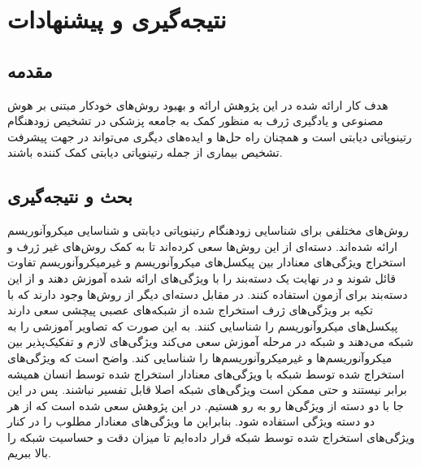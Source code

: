 \chapter{نتیجه‌گیری و پیشنهادات}

\section{مقدمه}
هدف کار ارائه شده در این پژوهش ارائه و بهبود روش‌های خودکار مبتنی بر هوش مصنوعی و یادگیری ژرف به منظور کمک به جامعه پزشکی در تشخیص زودهنگام رتینوپاتی دیابتی است و همچنان راه حل‌ها و ایده‌های دیگری می‌تواند در جهت پیشرفت تشخیص بیماری از جمله رتینوپاتی دیابتی کمک کننده باشند.
\section{بحث و نتیجه‌گیری}
روش‌های مختلفی برای شناسایی زودهنگام رتینوپاتی دیابتی و شناسایی میکروآنوریسم ارائه شده‌اند. دسته‌ای از این روش‌ها سعی کرده‌اند تا به کمک روش‌های غیر ژرف و استخراج ویژگی‌های معنادار بین پیکسل‌های میکروآنوریسم‌ و غیرمیکروآنوریسم‌ تفاوت قائل شوند و در نهایت یک دسته‌بند را با ویژگی‌های ارائه شده آموزش دهند و از این دسته‌بند برای آزمون استفاده کنند.
\noindent
در مقابل دسته‌ای دیگر از روش‌ها وجود دارند که با تکیه بر ویژگی‌های ژرف استخراج شده از شبکه‌های عصبی پیچشی سعی دارند پیکسل‌های میکروآنوریسم را شناسایی کنند. به این صورت که تصاویر آموزشی را به شبکه می‌دهند و شبکه در مرحله آموزش سعی می‌کند ویژگی‌های لازم و تفکیک‌پذیر بین میکروآنوریسم‌ها و غیرمیکروآنوریسم‌ها را شناسایی کند. واضح است که ویژگی‌های استخراج شده توسط شبکه با ویژگی‌های معنادار استخراج شده توسط انسان همیشه برابر نیستند و حتی ممکن است ویژگی‌های شبکه اصلا قابل تفسیر نباشند.
\noindent
پس در این جا با دو دسته از ویژگی‌ها رو به رو هستیم. در این پژوهش سعی شده است که از هر دو دسته ویژگی استفاده شود. بنابراین ما ویژگی‌های معنادار مطلوب را در کنار ویژگی‌های استخراج شده توسط شبکه قرار داده‌ایم تا میزان دقت و حساسیت شبکه را بالا ببریم.
